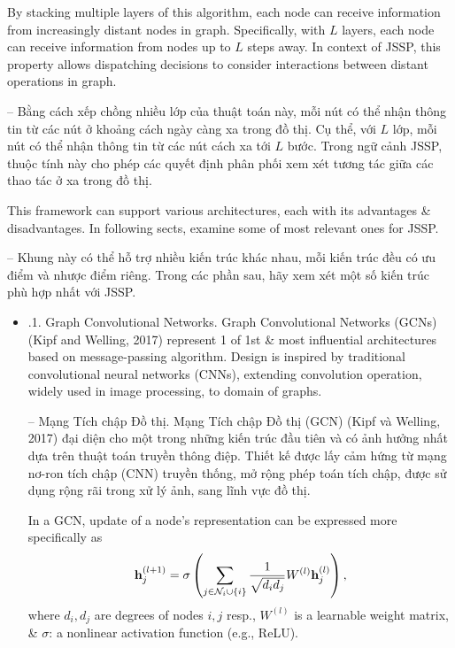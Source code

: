 \documentclass{article}
\begin{document}
\begin{itemize}
\begin{itemize}
        By stacking multiple layers of this algorithm, each node can receive information from increasingly distant nodes in graph. Specifically, with $L$ layers, each node can receive information from nodes up to $L$ steps away. In context of JSSP, this property allows dispatching decisions to consider interactions between distant operations in graph.

        -- Bằng cách xếp chồng nhiều lớp của thuật toán này, mỗi nút có thể nhận thông tin từ các nút ở khoảng cách ngày càng xa trong đồ thị. Cụ thể, với $L$ lớp, mỗi nút có thể nhận thông tin từ các nút cách xa tới $L$ bước. Trong ngữ cảnh JSSP, thuộc tính này cho phép các quyết định phân phối xem xét tương tác giữa các thao tác ở xa trong đồ thị.

        This framework can support various architectures, each with its advantages \& disadvantages. In following sects, examine some of most relevant ones for JSSP.

        -- Khung này có thể hỗ trợ nhiều kiến trúc khác nhau, mỗi kiến trúc đều có ưu điểm và nhược điểm riêng. Trong các phần sau, hãy xem xét một số kiến trúc phù hợp nhất với JSSP.
        \begin{itemize}
            \item {.1. Graph Convolutional Networks.} Graph Convolutional Networks (GCNs) (Kipf and Welling, 2017) represent 1 of 1st \& most influential architectures based on message-passing algorithm. Design is inspired by traditional convolutional neural networks (CNNs), extending convolution operation, widely used in image processing, to domain of graphs.

            -- {\sf Mạng Tích chập Đồ thị.} Mạng Tích chập Đồ thị (GCN) (Kipf và Welling, 2017) đại diện cho một trong những kiến trúc đầu tiên và có ảnh hưởng nhất dựa trên thuật toán truyền thông điệp. Thiết kế được lấy cảm hứng từ mạng nơ-ron tích chập (CNN) truyền thống, mở rộng phép toán tích chập, được sử dụng rộng rãi trong xử lý ảnh, sang lĩnh vực đồ thị.

            In a GCN, update of a node's representation can be expressed more specifically as
            \begin{equation*}
                {\bf h}_j^{(l + 1)} = \sigma\left(\sum_{j\in{\cal N}_i\cup\{i\}} \frac{1}{\sqrt{d_id_j}}W^{(l)}{\bf h}_j^{(l)} \right),
            \end{equation*}
            where $d_i,d_j$ are degrees of nodes $i,j$ resp., $W^{(l)}$ is a learnable weight matrix, \& $\sigma$: a nonlinear activation function (e.g., ReLU).


\end{itemize}
\end{itemize}
\end{itemize}
\end{document}
